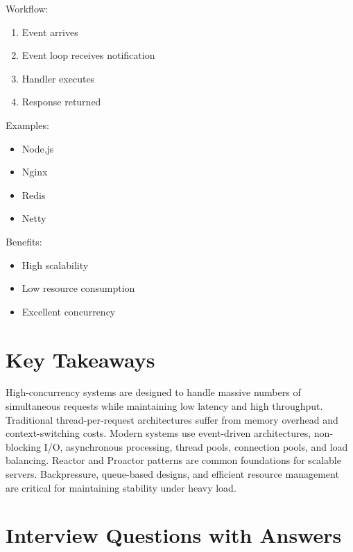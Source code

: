 Workflow:

\begin{enumerate}
\item Event arrives
\item Event loop receives notification
\item Handler executes
\item Response returned
\end{enumerate}

Examples:

\begin{itemize}
\item Node.js
\item Nginx
\item Redis
\item Netty
\end{itemize}

Benefits:

\begin{itemize}
\item High scalability
\item Low resource consumption
\item Excellent concurrency
\end{itemize}

\section{Key Takeaways}

\begin{keytakeaways}
High-concurrency systems are designed to handle massive numbers of simultaneous requests while maintaining low latency and high throughput. Traditional thread-per-request architectures suffer from memory overhead and context-switching costs. Modern systems use event-driven architectures, non-blocking I/O, asynchronous processing, thread pools, connection pools, and load balancing. Reactor and Proactor patterns are common foundations for scalable servers. Backpressure, queue-based designs, and efficient resource management are critical for maintaining stability under heavy load.
\end{keytakeaways}

\section{Interview Questions with Answers}

